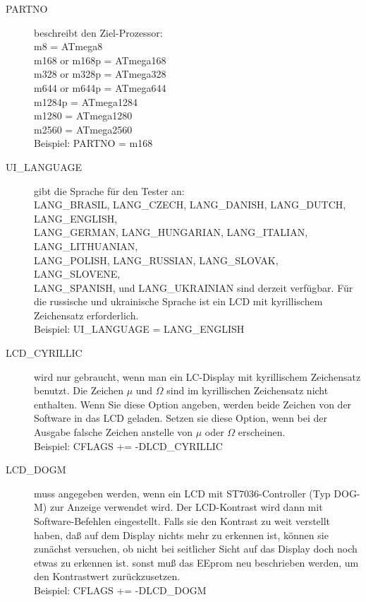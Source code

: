 \begin{description}
  \item[PARTNO] beschreibt den Ziel-Prozessor:\\
         m8 = ATmega8\\
         m168 or m168p = ATmega168\\
         m328 or m328p = ATmega328\\
         m644 or m644p = ATmega644\\
         m1284p        = ATmega1284\\
         m1280         = ATmega1280\\
         m2560         = ATmega2560\\
    Beispiel: PARTNO = m168

  \item[UI\_LANGUAGE] gibt die Sprache für den Tester an:\\
    LANG\_BRASIL, LANG\_CZECH, LANG\_DANISH, LANG\_DUTCH, LANG\_ENGLISH, \\
    LANG\_GERMAN, LANG\_HUNGARIAN, LANG\_ITALIAN, LANG\_LITHUANIAN, \\
    LANG\_POLISH, LANG\_RUSSIAN, LANG\_SLOVAK, LANG\_SLOVENE, \\
    LANG\_SPANISH, und LANG\_UKRAINIAN sind derzeit verfügbar.
 Für die russische und ukrainische Sprache ist ein LCD mit kyrillischem Zeichensatz erforderlich.\\
    Beispiel: UI\_LANGUAGE = LANG\_ENGLISH

  \item[LCD\_CYRILLIC] wird nur gebraucht, wenn man ein LC-Display mit kyrillischem Zeichensatz benutzt.
Die Zeichen \(\mu\) und \(\Omega\) sind im kyrillischen Zeichensatz nicht enthalten.
Wenn Sie diese Option angeben, werden beide Zeichen von der Software in das LCD geladen.
Setzen sie diese Option, wenn bei der Ausgabe falsche Zeichen anstelle von \(\mu\) oder \(\Omega\) erscheinen.\\
Beispiel: CFLAGS += -DLCD\_CYRILLIC

  \item[LCD\_DOGM] muss angegeben werden, wenn ein LCD mit ST7036-Controller (Typ DOG-M) zur Anzeige verwendet wird.
Der LCD-Kontrast wird dann mit Software-Befehlen eingestellt.
Falls sie den Kontrast zu weit verstellt haben, daß auf dem Display nichts mehr zu erkennen ist,
können sie zunächst versuchen, ob nicht bei seitlicher Sicht auf das Display doch noch etwas zu erkennen ist.
sonst muß das EEprom neu beschrieben werden, um den Kontrastwert zurückzusetzen.\\
Beispiel: CFLAGS += -DLCD\_DOGM


\end{description}
